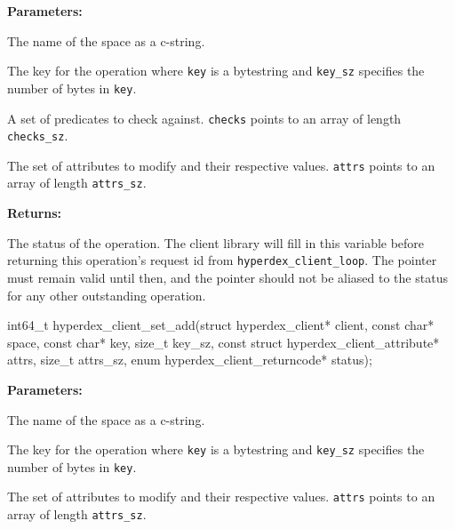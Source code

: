 \noindent\textbf{Parameters:}
\begin{description}[labelindent=\widthof{{\texttt{checks}, \texttt{checks\_sz}}},leftmargin=*,noitemsep,nolistsep,align=right]
\item[\texttt{space}] The name of the space as a c-string.
\item[\texttt{key}, \texttt{key\_sz}] The key for the operation where \texttt{key} is a bytestring and \texttt{key\_sz} specifies the number of bytes in \texttt{key}.
\item[\texttt{checks}, \texttt{checks\_sz}] A set of predicates to check against.  \texttt{checks} points to an array of length \texttt{checks\_sz}.
\item[\texttt{attrs}, \texttt{attrs\_sz}] The set of attributes to modify and their respective values.  \texttt{attrs} points to an array of length \texttt{attrs\_sz}.
\end{description}

\noindent\textbf{Returns:}
\begin{description}[labelindent=\widthof{{\texttt{status}}},leftmargin=*,noitemsep,nolistsep,align=right]
\item[\texttt{status}] The status of the operation.  The client library will fill in this variable before returning this operation's request id from \texttt{hyperdex\_client\_loop}.  The pointer must remain valid until then, and the pointer should not be aliased to the status for any other outstanding operation.
\end{description}

\funcsep
\begin{ccode}
int64_t hyperdex_client_set_add(struct hyperdex_client* client,
                const char* space,
                const char* key, size_t key_sz,
                const struct hyperdex_client_attribute* attrs, size_t attrs_sz,
                enum hyperdex_client_returncode* status);
\end{ccode}
\funcdesc 

\noindent\textbf{Parameters:}
\begin{description}[labelindent=\widthof{{\texttt{attrs}, \texttt{attrs\_sz}}},leftmargin=*,noitemsep,nolistsep,align=right]
\item[\texttt{space}] The name of the space as a c-string.
\item[\texttt{key}, \texttt{key\_sz}] The key for the operation where \texttt{key} is a bytestring and \texttt{key\_sz} specifies the number of bytes in \texttt{key}.
\item[\texttt{attrs}, \texttt{attrs\_sz}] The set of attributes to modify and their respective values.  \texttt{attrs} points to an array of length \texttt{attrs\_sz}.
\end{description}

